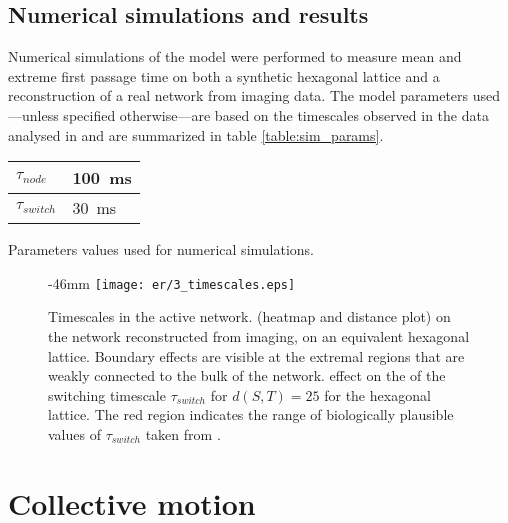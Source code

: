 \subsection{Numerical simulations and results}

Numerical simulations of the model were performed to measure mean and extreme first passage time on both a synthetic hexagonal lattice and a reconstruction of a real network from  imaging data. The model parameters used---unless specified otherwise---are based on the timescales observed in the  data analysed in  and are summarized in table \ref{table:sim_params}.


\begin{margintable}
  \sffamily
  \begin{tabular}{@{}ll@{}}
    $\tau_{node}$   & \SI{100}{\milli\second}  \\
    \hline
    $\tau_{switch}$ & \SI{30}{\milli\second}  \\
    \hline
  \end{tabular}
  \caption{Parameters values used for numerical simulations.}\label{table:sim_params}
\end{margintable}

\begin{figure}
  \begin{adjustwidth*}{}{-46mm}
    \texttt{[image: er/3\_timescales.eps]}%
    {{\label{fig:ts_er}}%
    {\label{fig:ts_hex}}%
    {\label{fig:ts_switching}}}%
    \caption{Timescales in the active network.
    \enspace {} (heatmap and distance plot) on the network reconstructed from  imaging, \enspace {} on an equivalent hexagonal lattice. Boundary effects are visible at the extremal regions that are weakly connected to the bulk of the network.
    \enspace effect on the  of the switching timescale $\tau_{switch}$ for $d(S, T) = 25$ for the hexagonal lattice. The red region indicates the range of biologically plausible values of $\tau_{switch}$ taken from \cite{holcman2018single}.\label{fig:ts}}

  \end{adjustwidth*}
\end{figure}

\section{Collective motion}
